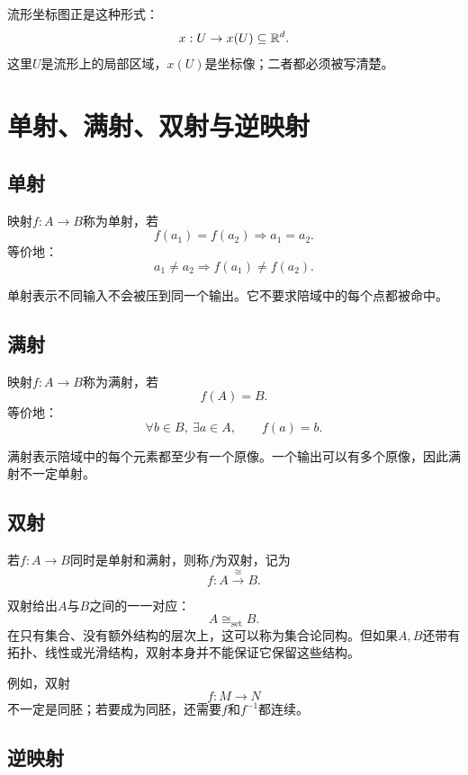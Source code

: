 流形坐标图正是这种形式：
\[
    x:U\to x(U)\subseteq\mathbb{R}^d.
\]
这里$U$是流形上的局部区域，$x(U)$是坐标像；二者都必须被写清楚。


\section{单射、满射、双射与逆映射}

\subsection{单射}

\begin{definition}[单射]
映射$f:A\to B$称为单射，若
\[
    f(a_1)=f(a_2)
    \Longrightarrow
    a_1=a_2.
\]
等价地：
\[
    a_1\neq a_2
    \Longrightarrow
    f(a_1)\neq f(a_2).
\]
\end{definition}

单射表示不同输入不会被压到同一个输出。它不要求陪域中的每个点都被命中。

\subsection{满射}

\begin{definition}[满射]
映射$f:A\to B$称为满射，若
\[
    f(A)=B.
\]
等价地：
\[
    \forall b\in B,\ \exists a\in A,\qquad f(a)=b.
\]
\end{definition}

满射表示陪域中的每个元素都至少有一个原像。一个输出可以有多个原像，因此满射不一定单射。

\subsection{双射}

\begin{definition}[双射]
若$f:A\to B$同时是单射和满射，则称$f$为双射，记为
\[
    f:A\xrightarrow{\cong}B.
\]
\end{definition}

双射给出$A$与$B$之间的一一对应：
\[
    A\cong_{\mathrm{set}}B.
\]
在只有集合、没有额外结构的层次上，这可以称为集合论同构。但如果$A,B$还带有拓扑、线性或光滑结构，双射本身并不能保证它保留这些结构。

例如，双射
\[
    f:M\to N
\]
不一定是同胚；若要成为同胚，还需要$f$和$f^{-1}$都连续。

\subsection{逆映射}

